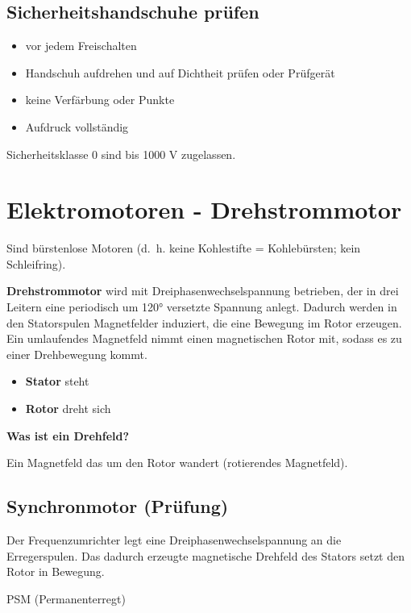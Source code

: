 \subsection{Sicherheitshandschuhe
prüfen}\label{sicherheitshandschuhe-pruefen}

\begin{itemize}
\item
  vor jedem Freischalten
\item
  Handschuh aufdrehen und auf Dichtheit prüfen oder Prüfgerät
\item
  keine Verfärbung oder Punkte
\item
  Aufdruck vollständig
\end{itemize}

Sicherheitsklasse 0 sind bis 1000 V zugelassen.

\section{Elektromotoren -
Drehstrommotor}\label{elektromotoren-drehstrommotor}

Sind bürstenlose Motoren (d.~h. keine Kohlestifte = Kohlebürsten; kein
Schleifring).

\textbf{Drehstrommotor} wird mit Dreiphasenwechselspannung betrieben,
der in drei Leitern eine periodisch um 120° versetzte Spannung anlegt.
Dadurch werden in den Statorspulen Magnetfelder induziert, die eine
Bewegung im Rotor erzeugen. Ein umlaufendes Magnetfeld nimmt einen
magnetischen Rotor mit, sodass es zu einer Drehbewegung kommt.

\begin{itemize}
\item
  \textbf{Stator} steht
\item
  \textbf{Rotor} dreht sich
\end{itemize}

\textbf{Was ist ein Drehfeld?}

Ein Magnetfeld das um den Rotor wandert (rotierendes Magnetfeld).

\subsection{Synchronmotor (Prüfung)}\label{synchronmotor-pruefung}

Der Frequenzumrichter legt eine Dreiphasenwechselspannung an die
Erregerspulen. Das dadurch erzeugte magnetische Drehfeld des Stators
setzt den Rotor in Bewegung.

PSM (Permanenterregt)


